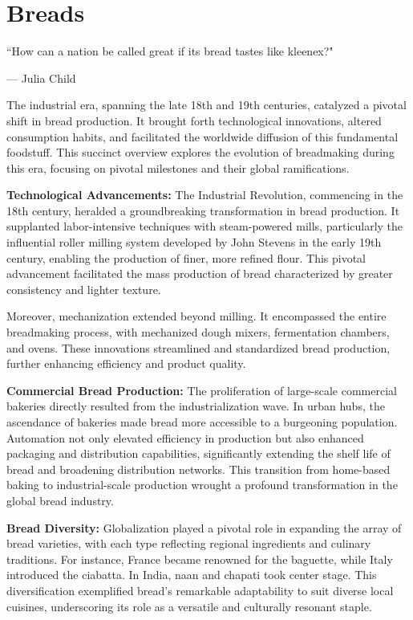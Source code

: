 \chapter{Breads}
\label{breads}
\epigraph{``How can a nation be called great if its bread tastes like kleenex?"}{--- \textup{Julia Child}}

The industrial era, spanning the late 18th and 19th centuries, catalyzed a pivotal shift in bread production. It brought forth technological innovations, altered consumption habits, and facilitated the worldwide diffusion of this fundamental foodstuff. This succinct overview explores the evolution of breadmaking during this era, focusing on pivotal milestones and their global ramifications.

\textbf{Technological Advancements:} The Industrial Revolution, commencing in the 18th century, heralded a groundbreaking transformation in bread production. It supplanted labor-intensive techniques with steam-powered mills, particularly the influential roller milling system developed by John Stevens in the early 19th century, enabling the production of finer, more refined flour. This pivotal advancement facilitated the mass production of bread characterized by greater consistency and lighter texture.

Moreover, mechanization extended beyond milling. It encompassed the entire breadmaking process, with mechanized dough mixers, fermentation chambers, and ovens. These innovations streamlined and standardized bread production, further enhancing efficiency and product quality.

\textbf{Commercial Bread Production:} The proliferation of large-scale commercial bakeries directly resulted from the industrialization wave. In urban hubs, the ascendance of bakeries made bread more accessible to a burgeoning population. Automation not only elevated efficiency in production but also enhanced packaging and distribution capabilities, significantly extending the shelf life of bread and broadening distribution networks. This transition from home-based baking to industrial-scale production wrought a profound transformation in the global bread industry.

\textbf{Bread Diversity:} Globalization played a pivotal role in expanding the array of bread varieties, with each type reflecting regional ingredients and culinary traditions. For instance, France became renowned for the baguette, while Italy introduced the ciabatta. In India, naan and chapati took center stage. This diversification exemplified bread's remarkable adaptability to suit diverse local cuisines, underscoring its role as a versatile and culturally resonant staple.

